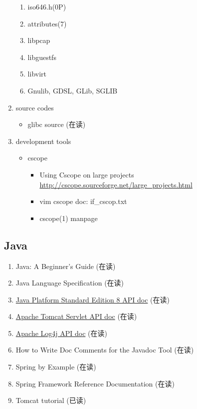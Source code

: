 \documentclass{article}
\begin{document}
\begin{enumerate}
\begin{enumerate}
            \item iso646.h(0P)
            \item attributes(7)
            \item libpcap
            \item libguestfs
            \item libvirt
            \item Gnulib, GDSL, GLib, SGLIB
        \end{enumerate}
    \item source codes
        \begin{itemize}
            \item glibc source (在读)
        \end{itemize}
    \item development tools
        \begin{itemize}
            \item cscope
                \begin{itemize}
                    \item Using Cscope on large projects \url{http://cscope.sourceforge.net/large_projects.html}
                    \item vim cscope doc: if_cscop.txt
                    \item cscope(1) manpage
                \end{itemize}
        \end{itemize}
\end{enumerate}
\subsection{Java}
\begin{enumerate}
    \item Java: A Beginner's Guide (在读)
    \item Java Language Specification (在读)
    \item \href{http://docs.oracle.com/javase/8/docs/api/index.html?overview-summary.html}{Java Platform Standard Edition 8 API doc} (在读)
    \item \href{http://tomcat.apache.org/tomcat-8.0-doc/servletapi/}{Apache Tomcat Servlet API doc} (在读)
    \item \href{http://logging.apache.org/log4j/2.x/log4j-api/apidocs/index.html}{Apache Log4j API doc} (在读)
    \item How to Write Doc Comments for the Javadoc Tool (在读)
    \item Spring by Example (在读)
    \item Spring Framework Reference Documentation (在读)
    \item Tomcat tutorial (已读)
\end{enumerate}
\end{document}

